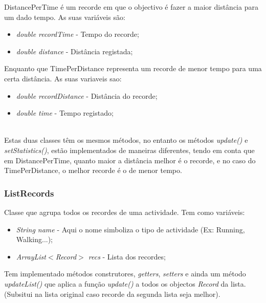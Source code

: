 \documentclass[10pt,notitlepage]{article}
\begin{document}
DistancePerTime é um recorde em que o objectivo é fazer a maior distância para um dado tempo.  
As suas variáveis são:
\begin{itemize}
\item \textit{double recordTime} - Tempo do recorde;
\item \textit{double distance} - Distância registada;
\end{itemize}
Enquanto que TimePerDistance representa um recorde de menor tempo para uma certa distância.
As suas variaveis sao:
\begin{itemize}
\item \textit{double recordDistance} - Distância do recorde;
\item \textit{double time} - Tempo registado;
\end{itemize}\\
Estas duas classes têm os mesmos métodos, no entanto os métodos \textit{update()} e \textit{setStatistics()}, estão implementados de maneiras diferentes, tendo em conta que em DistancePerTime, quanto maior a distância melhor é o recorde, e no caso do TimePerDistance,  o melhor recorde é o de menor tempo.


\subsubsection{ListRecords}

Classe que agrupa todos os recordes de uma actividade. Tem como variáveis:
\begin{itemize}
\item \textit{String name} - Aqui o nome simboliza o tipo de actividade (Ex: Running, Walking...);
\item \textit{ArrayList$<$Record$>$ recs} - Lista dos recordes;
\end{itemize}
Tem implementado métodos construtores, \textit{getters}, \textit{setters} e ainda um método \textit{updateList()} que aplica a função \textit{update()} a todos os objectos \textit{Record} da lista. (Subsitui na lista original caso recorde da segunda lista seja melhor).
\end{document}
